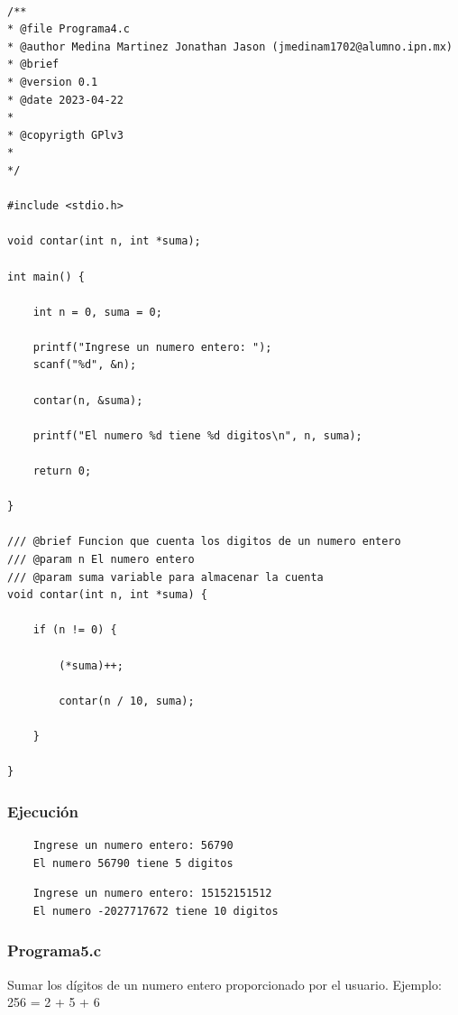 \documentclass{article}
\begin{document}
	\begin{lstlisting}

/**
* @file Programa4.c
* @author Medina Martinez Jonathan Jason (jmedinam1702@alumno.ipn.mx)
* @brief 
* @version 0.1
* @date 2023-04-22
* 
* @copyrigth GPlv3
* 
*/

#include <stdio.h>

void contar(int n, int *suma);

int main() {
	
	int n = 0, suma = 0;
	
	printf("Ingrese un numero entero: ");
	scanf("%d", &n);
	
	contar(n, &suma);
	
	printf("El numero %d tiene %d digitos\n", n, suma);
	
	return 0;
	
}

/// @brief Funcion que cuenta los digitos de un numero entero
/// @param n El numero entero
/// @param suma variable para almacenar la cuenta
void contar(int n, int *suma) {
	
	if (n != 0) {
		
		(*suma)++;
		
		contar(n / 10, suma);
		
	}
	
}
	\end{lstlisting}
	
	\subsubsection{Ejecución}
	
	\begin{lstlisting}
	Ingrese un numero entero: 56790
	El numero 56790 tiene 5 digitos
	\end{lstlisting}
	
	\begin{lstlisting}
	Ingrese un numero entero: 15152151512
	El numero -2027717672 tiene 10 digitos
	\end{lstlisting}
	
	\newpage
	
	\subsubsection{Programa5.c}
	
	Sumar los dígitos de un numero entero proporcionado por el usuario.
	Ejemplo: 256 = 2 + 5 + 6
	
\end{document}
